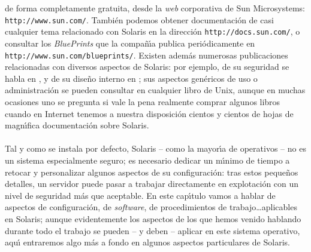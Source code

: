 de forma completamente gratuita,
desde la {\it web} corporativa de Sun Microsystems: {\tt http://www.sun.com/}.
Tambi\'en podemos obtener documentaci\'on de casi cualquier tema relacionado 
con Solaris en la direcci\'on {\tt http://docs.sun.com/}, o consultar los
{\it BluePrints} que la compa\~n\'{\i}a publica peri\'odicamente en {\tt 
http://www.sun.com/blueprints/}. Existen adem\'as numerosas publicaciones
relacionadas con diversos aspectos de Solaris: por ejemplo, de su seguridad se 
habla en \cite{kn:gre99}, y de su dise\~no interno en \cite{kn:mau00}; sus
aspectos gen\'ericos de uso o administraci\'on se pueden consultar en cualquier 
libro de Unix, aunque en muchas ocasiones uno se pregunta si vale la pena 
realmente comprar algunos libros cuando en Internet tenemos a nuestra 
disposici\'on cientos y cientos de hojas de magn\'{\i}fica documentaci\'on sobre
Solaris.\\
\\Tal y como se instala por defecto, Solaris -- como la mayor\'{\i}a de
operativos -- no es un sistema especialmente seguro; es necesario dedicar un
m\'{\i}nimo de tiempo a retocar y personalizar algunos aspectos de su
configuraci\'on: tras estos peque\~nos detalles, un servidor puede pasar a
trabajar directamente en explotaci\'on con un nivel de seguridad m\'as que
aceptable. En este cap\'{\i}tulo vamos a hablar de aspectos de configuraci\'on,
de {\it software}, de procedimientos de trabajo\ldots aplicables en Solaris; 
aunque evidentemente los aspectos de los que hemos venido hablando durante todo
el trabajo se pueden -- y deben -- aplicar en este sistema operativo, aqu\'{\i}
entraremos algo m\'as a fondo en algunos aspectos particulares de Solaris.
